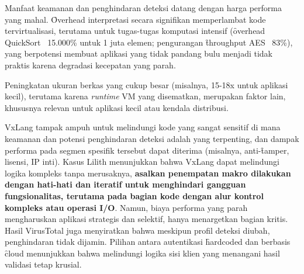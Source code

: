  Manfaat keamanan dan penghindaran deteksi datang dengan harga performa yang mahal. \f{Overhead} interpretasi secara signifikan memperlambat kode tervirtualisasi, terutama untuk tugas-tugas komputasi intensif (\f{overhead} QuickSort ~15.000\% untuk 1 juta elemen; pengurangan \f{throughput} AES ~83\%), yang berpotensi membuat aplikasi yang tidak pandang bulu menjadi tidak praktis karena degradasi kecepatan yang parah.

 Peningkatan ukuran berkas yang cukup besar (misalnya, 15-18x untuk aplikasi kecil), terutama karena \textit{runtime} VM yang disematkan, merupakan faktor lain, khususnya relevan untuk aplikasi kecil atau kendala distribusi.

 VxLang tampak ampuh untuk melindungi kode yang sangat sensitif di mana keamanan dan potensi penghindaran deteksi adalah yang terpenting, dan dampak performa pada segmen spesifik tersebut dapat diterima (misalnya, anti-\f{tamper}, lisensi, IP inti). Kasus Lilith menunjukkan bahwa VxLang dapat melindungi logika kompleks tanpa merusaknya, \textbf{asalkan penempatan makro dilakukan dengan hati-hati dan iteratif untuk menghindari gangguan fungsionalitas, terutama pada bagian kode dengan alur kontrol kompleks atau operasi I/O}. Namun, biaya performa yang parah mengharuskan aplikasi strategis dan selektif, hanya menargetkan bagian kritis. Hasil VirusTotal juga menyiratkan bahwa meskipun profil deteksi diubah, penghindaran tidak dijamin. Pilihan antara autentikasi \f{hardcoded} dan berbasis \f{cloud} menunjukkan bahwa melindungi logika sisi klien yang menangani hasil validasi tetap krusial.
